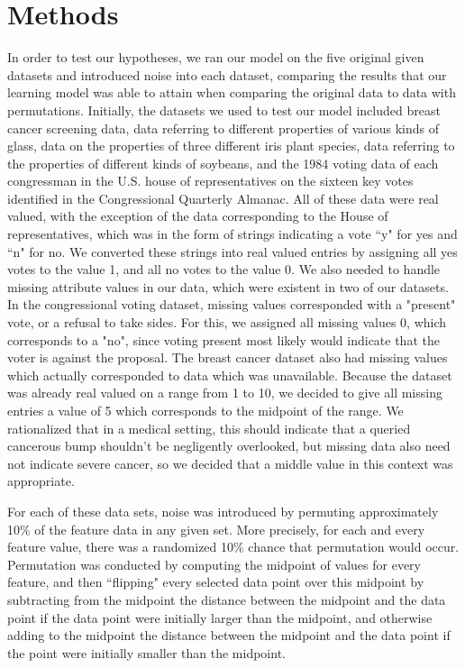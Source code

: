 \documentclass[twoside,11pt]{article}
\begin{document}
\section{Methods}
In order to test our hypotheses, we ran our model on the five original given datasets and introduced noise into each dataset,
comparing the results that our learning model was able to attain when comparing the original data to data with permutations.
Initially, the datasets we used to test our model included breast cancer screening data, data referring to different properties of
various kinds of glass, data on the properties of three different iris plant species, data referring to the properties of different 
kinds of soybeans, and the 1984 voting data of each congressman in the U.S. house of representatives on the sixteen key 
votes identified in the Congressional Quarterly Almanac. All of these data were real valued, with the exception of the data 
corresponding to the House of representatives, which was in the form of strings indicating a vote ``y" for yes and ``n" for no.
We converted these strings into real valued entries by assigning all yes votes to the value 1, and all no votes to the value 0.
We also needed to handle missing attribute values in our data, which were existent in two of our datasets. In the congressional
 voting dataset, missing values corresponded with a "present" vote, or a refusal to take sides. For this, we assigned all missing 
 values 0, which corresponds to a "no", since voting present most likely would indicate that the voter is against the proposal. 
 The breast cancer dataset also had missing values which actually corresponded to data which was unavailable. Because the dataset
  was already real valued on a range from 1 to 10, we decided to give all missing entries a value of 5 which corresponds to the midpoint
  of the range. We rationalized that in a medical setting, this should indicate that a queried cancerous bump shouldn't be negligently overlooked,
  but missing data also need not indicate severe cancer, so we decided that a middle value in this context was appropriate. 


For each of these data sets, noise was introduced by permuting
approximately 10\% of the feature data in any given set. More precisely, for each and every feature value, there was a randomized 10\%
chance that permutation would occur. Permutation was conducted by computing the midpoint of values for every feature, and then
``flipping" every selected data point over this midpoint by subtracting from the midpoint the distance between the midpoint and the data point
if the data point were initially larger than the midpoint, and otherwise adding to the midpoint the distance between the midpoint and the data
point if the point were initially smaller than the midpoint. 
\end{document}
